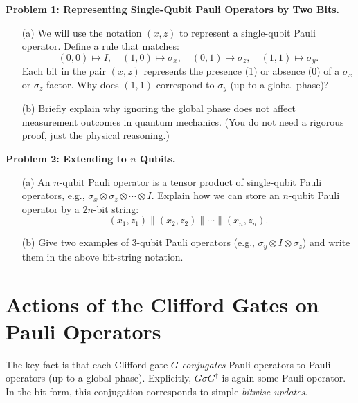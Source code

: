 \documentclass{article}
\begin{document}
    

\begin{Question}
    \textbf{Problem 1: Representing Single-Qubit Pauli Operators by Two Bits.}
    \begin{enumerate}
        \item[(a)] We will use the notation \((x, z)\) to represent a single-qubit Pauli operator. Define a rule that matches:
        \[
        (0, 0) \mapsto I, \quad (1, 0) \mapsto \sigma_x, \quad (0, 1) \mapsto \sigma_z, \quad (1, 1) \mapsto \sigma_y.
        \]
        Each bit in the pair \((x, z)\) represents the presence (1) or absence (0) of a \(\sigma_x\) or \(\sigma_z\) factor. Why does \((1, 1)\) correspond to \(\sigma_y\) (up to a global phase)?
        
        \item[(b)] Briefly explain why ignoring the global phase does not affect measurement outcomes in quantum mechanics. (You do not need a rigorous proof, just the physical reasoning.)
    \end{enumerate}
\end{Question}

\begin{question}
    \textbf{Problem 2: Extending to \(n\) Qubits.}
    \begin{enumerate}
        \item[(a)] An \(n\)-qubit Pauli operator is a tensor product of single-qubit Pauli operators, e.g., \(\sigma_x \otimes \sigma_z \otimes \cdots \otimes I\). Explain how we can store an \(n\)-qubit Pauli operator by a \(2n\)-bit string:
        \[
        (x_1, z_1) \parallel (x_2, z_2) \parallel \cdots \parallel (x_n, z_n).
        \]
        
        \item[(b)] Give two examples of 3-qubit Pauli operators (e.g., \(\sigma_y \otimes I \otimes \sigma_z\)) and write them in the above bit-string notation.
    \end{enumerate}
\end{question}

\section*{Actions of the Clifford Gates on Pauli Operators}
The key fact is that each Clifford gate \(G\) \textit{conjugates} Pauli operators to Pauli operators (up to a global phase). Explicitly, \(G \sigma G^\dagger\) is again some Pauli operator. In the bit form, this conjugation corresponds to simple \textit{bitwise updates}.
\end{document}
